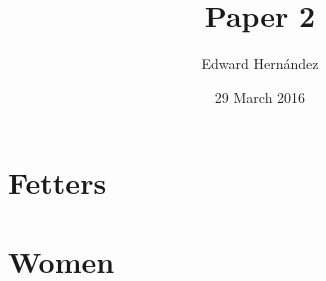 \documentclass[man,12pt,natbib]{apa6}
\begin{document}
\title{Paper 2}
\author{Edward Hern\'{a}ndez}
\date{29 March 2016}
\maketitle

\section{Fetters}



\section{Women}


\nocite{*}

\clearpage

\end{document}
